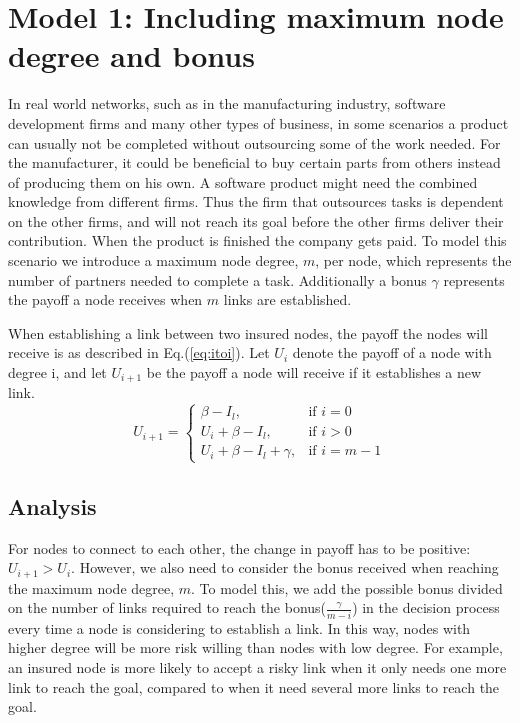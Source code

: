 \section{Model 1: Including maximum node degree and bonus}
In real world networks, such as in the manufacturing industry, software development firms and many other types of business, in some scenarios a product can usually not be completed without outsourcing some of the work needed. For the manufacturer, it could be beneficial to buy certain parts from others instead of producing them on his own. A software product might need the combined knowledge from different firms. Thus the firm that outsources tasks is dependent on the other firms, and will not reach its goal before the other firms deliver their contribution. When the product is finished the company gets paid.
To model this scenario we introduce a maximum node degree, $m$, per node, which represents the number of partners needed to complete a task. Additionally a bonus $\gamma$ represents the payoff a node receives when $m$ links are established. 

When establishing a link between two insured nodes, the payoff the nodes will receive is as described in Eq.(\ref{eq:itoi}).
Let $U_{i}$ denote the payoff of a node with degree i, and let $U_{i+1}$ be the payoff
a node will receive if it establishes a new link.
\begin{equation}
    U_{i+1}= 
\begin{cases}
    \beta - I_{l},& \text{if } i = 0\\
    U_{i}+\beta -I_{l},& \text{if }  i>0\\
    U_{i}+\beta -I_{l}+\gamma,& \text{if } i=m-1
    
\end{cases}
\label{eq:itoi}
\end{equation}

\subsection{Analysis}

For nodes to connect to each other, the change in payoff has to be positive: $U_{i+1} > U_{i}$. However, we also need to consider the bonus received when reaching the maximum node degree, $m$. 
To model this, we add the possible bonus divided on the number of links required to reach the bonus($\frac{\gamma}{m-i}$) in the decision process every time a node is considering to establish a link. 
In this way, nodes with higher degree will be more risk willing than nodes with low degree. For example, an insured node is more likely to accept a risky link when it only needs one more link to reach the goal, compared to when it need several more links to reach the goal.

